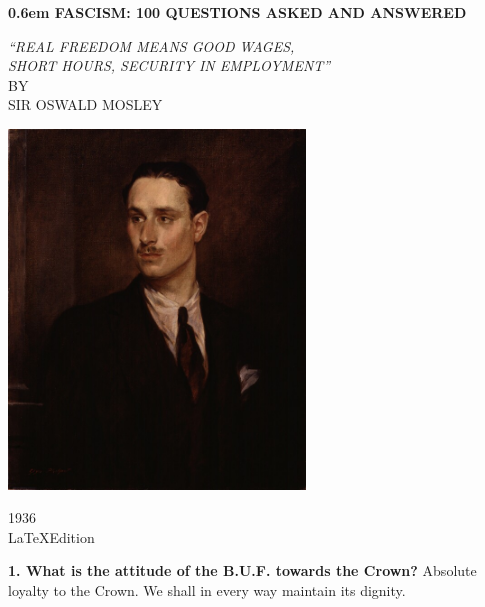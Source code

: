\documentclass{book}
\begin{document}
\pagecolor{black}
\color{white}%
\clearpage
\newcommand\nbvspace[1][3]{\vspace*{\stretch{#1}}}
\newcommand\nbstretchyspace{\spaceskip0.5em plus 0.25em minus 0.25em}
\newcommand{\nbtitlestretch}{\spaceskip0.6em}
\pagestyle{empty}
\begin{center}
\bfseries
\nbvspace[1]
\Huge
{\nbtitlestretch\huge
    \textbf{FASCISM}: 100 QUESTIONS ASKED AND ANSWERED}

\nbvspace[1]
\normalsize
    \textit{
``REAL FREEDOM MEANS GOOD WAGES,\\
SHORT HOURS, SECURITY IN EMPLOYMENT''\\
}
\nbvspace[1]
\small BY\\
    \Large SIR OSWALD MOSLEY\\[0.5em]

\nbvspace[2]

\includegraphics[width=3.1in]{./img/1.jpg}
\nbvspace[3]
\normalsize

1936\\
\large
\LaTeX \space Edition
\nbvspace[1]
\end{center}
\newpage
\pagecolor{white}
\color{black}
\begin{flushright}
\textbf{1. What is the attitude of the B.U.F. towards the Crown?}
Absolute loyalty to the Crown. We shall in every way maintain its
dignity.
\end{flushright}
\end{document}
